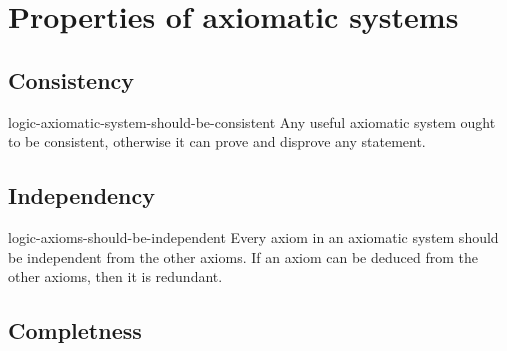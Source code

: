 \documentclass[preview]{standalone}
\begin{document}
\genpage

\section{Properties of axiomatic systems}

\subsection{Consistency}


\begin{snippet}{logic-axiomatic-system-should-be-consistent}
    Any useful axiomatic system ought to be consistent, otherwise it can prove and disprove any statement.
\end{snippet}

\subsection{Independency}


\begin{snippet}{logic-axioms-should-be-independent}
Every axiom in an axiomatic system should be independent from the other axioms.
If an axiom can be deduced from the other axioms, then it is redundant.
\end{snippet}

\subsection{Completness}

\end{document}
